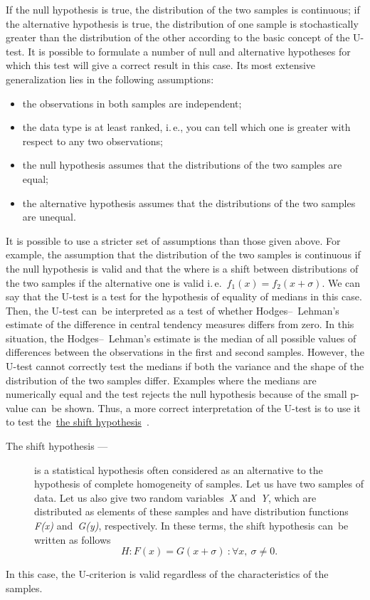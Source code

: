 \documentclass[]{scrreprt}
\begin{document}
If the null hypothesis is true, the distribution of the two samples is continuous; if the alternative hypothesis is true, the distribution of one sample is stochastically greater than the distribution of the other according to the basic concept of the U-test. It is possible to formulate a number of null and alternative hypotheses for which this test will give a correct result in this case. Its most extensive generalization lies in the following assumptions:
\begin{itemize}
	\item the observations in both samples are independent;
	\item the data type is at least ranked, i.\,e., you can tell which one is greater with respect to any two observations;
	\item the null hypothesis assumes that the distributions of the two samples are equal;
	\item the alternative hypothesis assumes that the distributions of the two samples are unequal.
\end{itemize}
It is possible to use a stricter set of assumptions than those given above. For example, the assumption that the distribution of the two samples is continuous if the null hypothesis is valid and that the where is a shift between distributions of the two samples if the alternative one is valid i.\,e.~$f_{1}(x)=f_{2}(x+\sigma)$. We can say that the U-test is a test for the hypothesis of equality of medians in this case. Then, the U-test can~be interpreted as a test of whether Hodges--~Lehman's estimate of the difference in central tendency measures differs from zero. In this situation, the Hodges--~Lehman's estimate is the median of all possible values of differences between the observations in the first and second samples. However, the U-test cannot correctly test the medians if both the variance and the shape of the distribution of the two samples differ. Examples where the medians are numerically equal and the test rejects the null hypothesis because of the small p-value can~be shown. Thus, a more correct interpretation of the U-test is to use it to test the~\href{http://www.machinelearning.ru/wiki/index.php?title=Гипотеза_сдвига}{the shift hypothesis}~\cite{MLRU:shift-hypothesis}.
\begin{description}
	\item[The shift hypothesis ---] is a statistical hypothesis often considered as an alternative to the hypothesis of complete homogeneity of samples. Let us have two samples of data. Let us also give two random variables~\textit{X} and~\textit{Y}, which are distributed as elements of these samples and have distribution functions \textit{F(x)} and~\textit{G(y)}, respectively. In these terms, the shift hypothesis can~be written as follows
	\begin{equation}\label{eq:shift-hypothesis}
	H:F(x)=G(x+\sigma)\ : \forall x,\ \sigma \neq 0.
	\end{equation}
\end{description}
In this case, the U-criterion is valid regardless of the characteristics of the samples.
\end{document}
